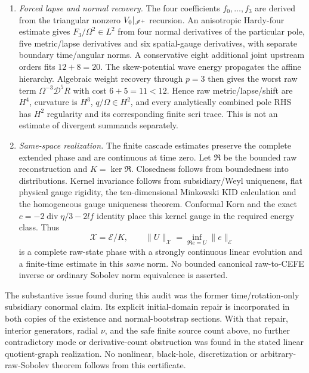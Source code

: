 \begin{enumerate}
\item \emph{Forced lapse and normal recovery.}  The four coefficients
$f_0,\ldots,f_3$ are derived from the triangular nonzero $V_0|_{\mathscr I^+}$
recursion.  An anisotropic Hardy-four estimate gives
$F_3/\Omega^2\in L^2$ from four normal derivatives of the particular pole,
five metric/lapse derivatives and six spatial-gauge derivatives, with
separate boundary time/angular norms.  A conservative eight additional
joint upstream orders fits $12+8=20$.
The skew-potential wave energy propagates the affine hierarchy.
Algebraic weight recovery through $p=3$ then gives the worst raw term
$\Omega^{-3}\mathcal D^5R$ with cost $6+5=11<12$.
Hence raw metric/lapse/shift are $H^4$, curvature is $H^3$,
$q/\Omega\in H^2$, and every analytically combined pole RHS has $H^2$
regularity and its corresponding finite scri trace.  This is not an
estimate of divergent summands separately.

\item \emph{Same-space realization.}  The finite cascade estimates preserve
the complete extended phase and are continuous at time zero.  Let
$\mathfrak R$ be the bounded raw reconstruction and
$K=\ker\mathfrak R$.  Closedness follows from boundedness into distributions.
Kernel invariance follows from subsidiary/Weyl uniqueness, flat physical
gauge rigidity, the ten-dimensional Minkowski KID calculation and the
homogeneous gauge uniqueness theorem.  Conformal Korn and the exact
$c=-2\operatorname{div}\eta/3-2lf$ identity place this kernel gauge in the
required energy class.  Thus
\[
 \mathcal X=\mathcal E/K,\qquad
 \|U\|_{\mathcal X}
  =\inf_{\mathfrak Re=U}\|e\|_{\mathcal E}
\]
is a complete raw-state phase with a strongly continuous linear evolution
and a finite-time estimate in this \emph{same} norm.  No bounded canonical
raw-to-CEFE inverse or ordinary Sobolev norm equivalence is asserted.
\end{enumerate}

The substantive issue found during this audit was the former
time/rotation-only subsidiary conormal claim.  Its explicit initial-domain
repair is incorporated in both copies of the existence and normal-bootstrap
sections.  With that repair, interior generators, radial $\nu$, and the safe
finite source count above, no further contradictory mode or derivative-count
obstruction was found in the stated linear quotient-graph realization.
No nonlinear, black-hole, discretization or arbitrary-raw-Sobolev theorem
follows from this certificate.

